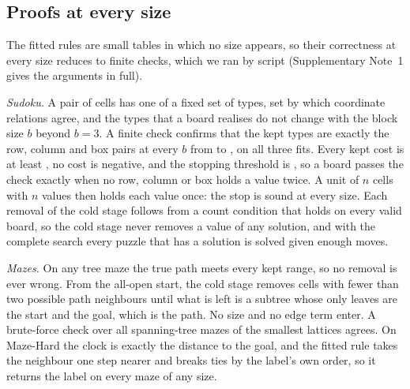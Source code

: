 \begin{table}[tbp]\centering\scriptsize
\caption{ Each row is one check fitted jointly on the
training answers of all its tasks. Task named: whether a bit naming the task is among the inputs. Fit: wall clock on one
laptop core. Scores: the library's scorer on the official test and on fresh inputs of 1,024 nodes or items, per task.}
\label{tab:shared}

\end{table}

\subsection{Proofs at every size}\label{sec:proofs}

The fitted rules are small tables in which no size appears, so their correctness at every size reduces to finite
checks, which we ran by script (Supplementary Note~1 gives the arguments in full).

\emph{Sudoku.} A pair of cells has one of a fixed set of types, set by which coordinate relations agree, and the types
that a board realises do not change with the block size $b$ beyond $b=3$. A finite check confirms that the kept types
are exactly the row, column and box pairs at every $b$ from  to , on all three fits. Every
kept cost is at least , no cost is negative, and the stopping threshold is , so a board
passes the check exactly when no row, column or box holds a value twice. A unit of $n$ cells with $n$ values then holds
each value once: the stop is sound at every size. Each removal of the cold stage follows from a count condition that
holds on every valid board, so the cold stage never removes a value of any solution, and with the complete search every
puzzle that has a solution is solved given enough moves.

\emph{Mazes.} On any tree maze the true path meets every kept range, so no removal is ever wrong. From the all-open
start, the cold stage removes cells with fewer than two possible path neighbours until what is left is a subtree whose
only leaves are the start and the goal, which is the path. No size and no edge term enter. A brute-force check over all
 spanning-tree mazes of the smallest lattices agrees. On Maze-Hard the clock is exactly the distance to
the goal, and the fitted rule takes the neighbour one step nearer and breaks ties by the label's own order, so it
returns the label on every maze of any size.

